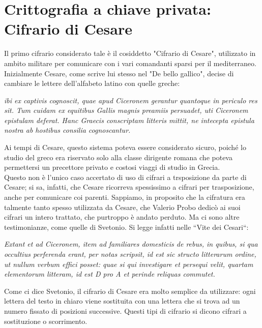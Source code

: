\documentclass[italian,A4,12pt]{article}
\begin{document}
    \section{Crittografia a chiave privata: Cifrario di Cesare}
    Il primo cifrario considerato tale è il cosiddetto "Cifrario di Cesare", utilizzato in ambito militare per comunicare con i vari comandanti sparsi per il mediterraneo.
    Inizialmente Cesare, come scrive lui stesso nel "De bello gallico", decise di cambiare le lettere dell'alfabeto latino con quelle greche:
    \begin{displayquote}
      \textit{ibi ex captivis cognoscit, quae apud Ciceronem gerantur quantoque in periculo res sit.
      Tum cuidam ex equitibus Gallis magnis preamiis persuadet, uti Ciceronem epistulam deferat.
      Hanc Graecis conscriptam litteris mittit, ne intecepta epistula nostra ab hostibus consilia cognoscantur.}
    \end{displayquote}
    Ai tempi di Cesare, questo sistema poteva essere considerato sicuro, poiché lo studio del greco era riservato solo alla classe dirigente romana che poteva permettersi un precettore
    privato e costosi viaggi di studio in Grecia.\\
    Questo non è l’unico caso accertato di uso di cifrari a trsposizione da parte di Cesare; si sa, infatti, che Cesare ricorreva spessissimo a cifrari per trasposizione, anche per comunicare coi parenti. Sappiamo, in proposito che la cifratura era talmente tanto spesso utilizzata da Cesare, che Valerio Probo dedicò ai suoi cifrari un intero trattato, che purtroppo è andato perduto. Ma ci sono altre testimonianze, come quelle di Svetonio. Si legge infatti nelle “Vite dei Cesari“:
    \begin{displayquote}
      \textit{Extant et ad Ciceronem, item ad familiares domesticis de rebus, in quibus, si qua occultius perferenda erant, per notas scripsit, id est sic structo litterarum ordine, ut nullum verbum effici posset: quae si qui investigare et persequi velit, quartam elementorum litteram, id est D pro A et perinde reliquas commutet.\\}
    \end{displayquote}
    Come ci dice Svetonio, il cifrario di Cesare era molto semplice da utilizzare: ogni lettera del testo in chiaro viene sostituita con una lettera che si trova ad un numero fissato di posizioni successive. Questi tipi di cifrario si dicono cifrari a sostituzione o scorrimento.\\
\end{document}
